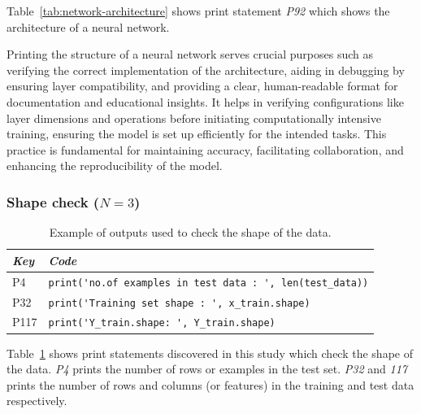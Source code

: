 Table~\ref{tab:network-architecture} shows print statement \emph{P92} which shows the architecture of a neural network.

Printing the structure of a neural network serves crucial purposes such as verifying the correct implementation of the architecture, aiding in debugging by ensuring layer compatibility, and providing a clear, human-readable format for documentation and educational insights. It helps in verifying configurations like layer dimensions and operations before initiating computationally intensive training, ensuring the model is set up efficiently for the intended tasks. This practice is fundamental for maintaining accuracy, facilitating collaboration, and enhancing the reproducibility of the model.


\subsubsection{Shape check ($N = 3$)}

\begin{table}
  \centering
  \caption{Example of outputs used to check the shape of the data.}
  \begin{tabular}{@{}m{} m{}@{}}
    \toprule
    \emph{\textbf{Key}} & \emph{\textbf{Code}}\\
    \midrule
    P4 &
    \lstinline[]$print('no.of examples in test data : ', len(test_data))$\\

    P32 &
    \lstinline[]$print('Training set shape : ', x_train.shape)$\\

    P117&
    \lstinline[]$print('Y_train.shape: ', Y_train.shape)$\\
    \bottomrule
  \end{tabular}
  \label{tab:shape-check}
\end{table}

Table~\ref{tab:shape-check} shows print statements discovered in this study which check the shape of the data. \emph{P4} prints the number of rows or examples in the test set. \emph{P32} and \emph{117} prints the number of rows and columns (or features) in the training and test data respectively.

